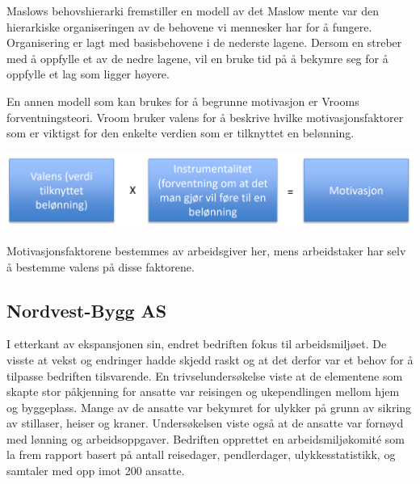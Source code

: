 \documentclass[norsk]{article}
\begin{document}
\vspace{1cm}

Maslows behovshierarki fremstiller en modell av det Maslow mente var den hierarkiske organiseringen av de behovene vi mennesker har for å fungere. Organisering er lagt med basisbehovene i de nederste lagene. Dersom en streber med å oppfylle et av de nedre lagene, vil en bruke tid på å bekymre seg for å oppfylle et lag som ligger høyere.   

En annen modell som kan brukes for å begrunne motivasjon er Vrooms forventningsteori. Vroom bruker valens for å beskrive hvilke motivasjonsfaktorer som er viktigst for den enkelte verdien som er tilknyttet en belønning.

\vspace{1cm}
\begin{center}
    {\includegraphics[width=1\textwidth, draft=false]{Vedlegg/Vroom.png}}
\end{center}

\vspace{1cm}

Motivasjonsfaktorene bestemmes av arbeidsgiver her, mens arbeidstaker har selv å bestemme valens på disse faktorene.

\subsection{Nordvest-Bygg AS}

I etterkant av ekspansjonen sin, endret bedriften fokus til arbeidsmiljøet. De visste at vekst og endringer hadde skjedd raskt og at det derfor var et behov for å tilpasse bedriften tilsvarende. En trivselundersøkelse viste at de elementene som skapte stor påkjenning for ansatte var reisingen og ukependlingen mellom hjem og byggeplass. Mange av de ansatte var bekymret for ulykker på grunn av sikring av stillaser, heiser og kraner. Undersøkelsen viste også at de ansatte var fornøyd med lønning og arbeidsoppgaver. Bedriften opprettet en arbeidsmiljøkomité som la frem rapport basert på antall reisedager, pendlerdager, ulykkesstatistikk, og samtaler med opp imot 200 ansatte. 
\end{document}

